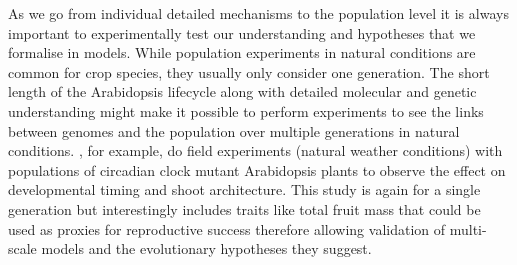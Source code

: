 As we go from individual detailed mechanisms to the population level it is
always important to experimentally test our understanding and hypotheses that we
formalise in models. While population experiments in natural conditions are
common for crop species, they usually only consider one generation. The short
length of the Arabidopsis lifecycle along with detailed molecular and genetic
understanding might make it possible to perform experiments to see the links
between genomes and the population over multiple generations in natural
conditions. \citet{rubin_circadian_2018}, for example, do field experiments
(natural weather conditions) with populations of circadian clock mutant
Arabidopsis plants to observe the effect on developmental timing and shoot
architecture. This study is again for a single generation but interestingly
includes traits like total fruit mass that could be used as proxies for
reproductive success therefore allowing validation of multi-scale models and the
evolutionary hypotheses they suggest.











